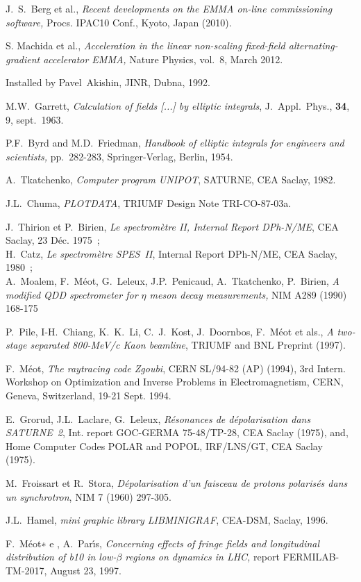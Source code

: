 \begin{thebibliography}{99}
J.~S.~Berg et al., 
\textsl{Recent developments on the EMMA on-line commissioning software,} 
Procs. IPAC10 Conf., Kyoto, Japan (2010). 

S. Machida et al., 
\textsl{Acceleration in the linear non-scaling fixed-field alternating-gradient accelerator EMMA, }
Nature Physics, vol.~8, March 2012.

 Installed by Pavel~Akishin, JINR, Dubna, 1992.

M.W.~Garrett, 
\textsl{Calculation of fields  [...] by elliptic integrals}, 
J.~Appl.~Phys., \textbf{34}, 9, sept.~1963.  

P.F.~Byrd and M.D.~Friedman, 
\textsl{Handbook of elliptic integrals for engineers and scientists,} 
pp.~282-283, Springer-Verlag, Berlin, 1954.  

A.~Tkatchenko, 
\textsl{Computer program UNIPOT}, 
SATURNE, CEA Saclay, 1982. 

J.L.~Chuma, 
\textsl{PLOTDATA}, 
TRIUMF Design Note TRI-CO-87-03a.

J.~Thirion et P.~Birien, 
\textsl{Le spectrom\`etre II, Internal Report DPh-N/ME}, 
CEA Saclay, 23 D\'ec. 1975~; \\
H.~Catz, 
\textsl{Le spectrom\`etre SPES~II}, Internal Report DPh-N/ME, CEA Saclay, 1980~; \\
 A.~Moalem, F.~M\'eot, G.~Leleux, J.P.~Penicaud, A.~Tkatchenko, P.~Birien,  
\textsl{A modified QDD spectrometer for $\eta$ meson decay measurements,  } 
NIM A289 (1990) 168-175 

P.~Pile, I-H.~Chiang, K.~K.~Li, C.~J.~Kost, J.~Doornbos, F.~M\'eot et als., 
\textsl{A two-stage separated 800-MeV/c Kaon beamline}, 
 TRIUMF and BNL Preprint (1997).

F.~M\'eot, 
\textsl{The raytracing code Zgoubi}, CERN SL/94-82 (AP) (1994), 
3rd Intern. Workshop on Optimization and Inverse Problems 
in Electromagnetism, CERN, Geneva, Switzerland, 19-21 Sept. 1994. 

E.~Grorud, J.L.~Laclare, G.~Leleux, 
\textsl{R\'esonances de d\'epolarisation dans SATURNE~2}, 
Int. report GOC-GERMA 75-48/TP-28, CEA Saclay (1975), 
and, Home Computer Codes POLAR and POPOL, IRF/LNS/GT, CEA Saclay (1975).

M.~Froissart et R.~Stora, 
\textsl{D\'epolarisation d'un faisceau de protons polaris\'es dans un synchrotron},
 NIM 7 (1960) 297-305.

J.L.~Hamel, 
\textsl{mini graphic library LIBMINIGRAF}, 
CEA-DSM, Saclay, 1996.

F.~M\'eot∗ e , A.~Par\'{\i}s, 
\textsl{Concerning effects of fringe fields and longitudinal distribution of b10 in
low-$\beta$ regions on dynamics in LHC, } 
report FERMILAB-TM-2017, August 23, 1997. 

\end{thebibliography}



